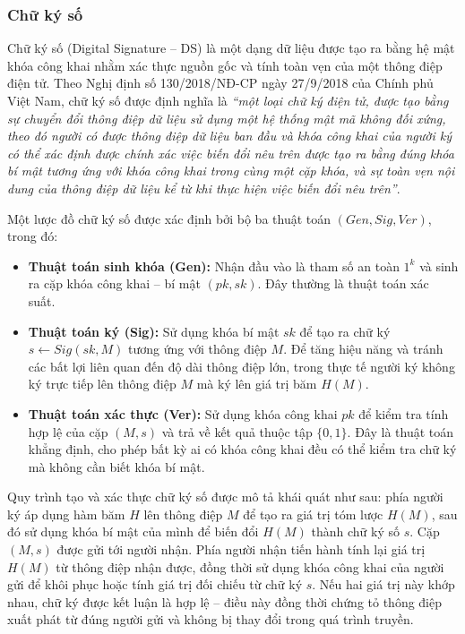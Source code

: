 \subsubsection{Chữ ký số}

Chữ ký số (Digital Signature -- DS) là một dạng dữ liệu được tạo ra bằng hệ mật khóa công khai nhằm xác thực nguồn gốc và tính toàn vẹn của một thông điệp điện tử. Theo Nghị định số 130/2018/NĐ-CP ngày 27/9/2018 của Chính phủ Việt Nam, chữ ký số được định nghĩa là \textit{``một loại chữ ký điện tử, được tạo bằng sự chuyển đổi thông điệp dữ liệu sử dụng một hệ thống mật mã không đối xứng, theo đó người có được thông điệp dữ liệu ban đầu và khóa công khai của người ký có thể xác định được chính xác việc biến đổi nêu trên được tạo ra bằng đúng khóa bí mật tương ứng với khóa công khai trong cùng một cặp khóa, và sự toàn vẹn nội dung của thông điệp dữ liệu kể từ khi thực hiện việc biến đổi nêu trên''}.

Một lược đồ chữ ký số được xác định bởi bộ ba thuật toán $(Gen, Sig, Ver)$, trong đó:

\begin{itemize}
    \item \textbf{Thuật toán sinh khóa (Gen):} Nhận đầu vào là tham số an toàn $1^k$ và sinh ra cặp khóa công khai -- bí mật $(pk, sk)$. Đây thường là thuật toán xác suất.

    \item \textbf{Thuật toán ký (Sig):} Sử dụng khóa bí mật $sk$ để tạo ra chữ ký $s \leftarrow Sig(sk, M)$ tương ứng với thông điệp $M$. Để tăng hiệu năng và tránh các bất lợi liên quan đến độ dài thông điệp lớn, trong thực tế người ký không ký trực tiếp lên thông điệp $M$ mà ký lên giá trị băm $H(M)$.

    \item \textbf{Thuật toán xác thực (Ver):} Sử dụng khóa công khai $pk$ để kiểm tra tính hợp lệ của cặp $(M, s)$ và trả về kết quả thuộc tập $\{0, 1\}$. Đây là thuật toán khẳng định, cho phép bất kỳ ai có khóa công khai đều có thể kiểm tra chữ ký mà không cần biết khóa bí mật.
\end{itemize}

Quy trình tạo và xác thực chữ ký số được mô tả khái quát như sau: phía người ký áp dụng hàm băm $H$ lên thông điệp $M$ để tạo ra giá trị tóm lược $H(M)$, sau đó sử dụng khóa bí mật của mình để biến đổi $H(M)$ thành chữ ký số $s$. Cặp $(M, s)$ được gửi tới người nhận. Phía người nhận tiến hành tính lại giá trị $H(M)$ từ thông điệp nhận được, đồng thời sử dụng khóa công khai của người gửi để khôi phục hoặc tính giá trị đối chiếu từ chữ ký $s$. Nếu hai giá trị này khớp nhau, chữ ký được kết luận là hợp lệ -- điều này đồng thời chứng tỏ thông điệp xuất phát từ đúng người gửi và không bị thay đổi trong quá trình truyền.

